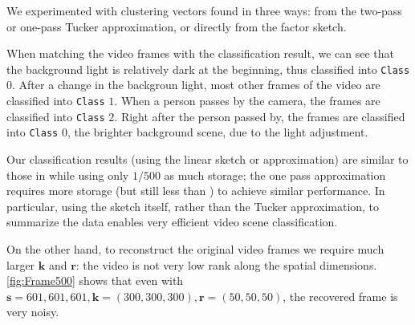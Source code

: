 We experimented with clustering vectors found in three ways:
from the two-pass or one-pass Tucker approximation,
or directly from the factor sketch. %

When matching the video frames with the classification result,
we can see that the background light is relatively dark at the beginning,
thus classified into \texttt{Class} $0$.
After a change in the backgroun light,
most other frames of the video are classified into \texttt{Class} $1$.
When a person passes by the camera, the frames are classified into \texttt{Class} $2$.
Right after the person passed by, the frames are classified into \texttt{Class} $0$,
the brighter background scene, due to the light adjustment.

Our classification results (using the linear sketch or approximation)
are similar to those in \cite{malik2018low}
while using only $1/500$ as much storage; the one pass approximation
requires more storage (but still less than \cite{malik2018low}) 
to achieve similar performance.
In particular, using the sketch itself, rather than the Tucker approximation,
to summarize the data enables very efficient video scene classification.

On the other hand, to reconstruct the original video frames
we require much larger $\mathbf{k}$ and $\mathbf{r}$:
the video is not very low rank along the spatial dimensions.
\ref{fig:Frame500} shows that
even with $\mathbf{s} = {601, 601, 601}, \mathbf{k} = (300, 300, 300), \mathbf{r} = (50, 50, 50)$, the recovered frame is very noisy.
